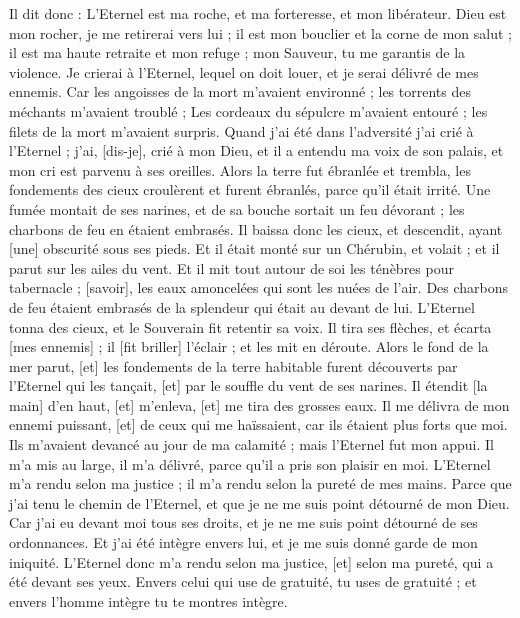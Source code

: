 \begin{multicols}{2}
Il dit donc : L'Eternel est ma roche, et ma forteresse, et mon libérateur.
Dieu est mon rocher, je me retirerai vers lui ; il est mon bouclier et la corne de mon salut ; il est ma haute retraite et mon refuge ; mon Sauveur, tu me garantis de la violence.
Je crierai à l'Eternel, lequel on doit louer, et je serai délivré de mes ennemis.
Car les angoisses de la mort m'avaient environné ; les torrents des méchants m'avaient troublé ;
Les cordeaux du sépulcre m'avaient entouré ; les filets de la mort m'avaient surpris.
Quand j'ai été dans l'adversité j'ai crié à l'Eternel ; j'ai, [dis-je], crié à mon Dieu, et il a entendu ma voix de son palais, et mon cri est parvenu à ses oreilles.
Alors la terre fut ébranlée et trembla, les fondements des cieux croulèrent et furent ébranlés, parce qu'il était irrité.
Une fumée montait de ses narines, et de sa bouche sortait un feu dévorant ; les charbons de feu en étaient embrasés.
Il baissa donc les cieux, et descendit, ayant [une] obscurité sous ses pieds.
Et il était monté sur un Chérubin, et volait ; et il parut sur les ailes du vent.
Et il mit tout autour de soi les ténèbres pour tabernacle ; [savoir], les eaux amoncelées qui sont les nuées de l'air.
Des charbons de feu étaient embrasés de la splendeur qui était au devant de lui.
L'Eternel tonna des cieux, et le Souverain fit retentir sa voix.
Il tira ses flèches, et écarta [mes ennemis] ; il [fit briller] l'éclair ; et les mit en déroute.
Alors le fond de la mer parut, [et] les fondements de la terre habitable furent découverts par l'Eternel qui les tançait, [et] par le souffle du vent de ses narines.
Il étendit [la main] d'en haut, [et] m'enleva, [et] me tira des grosses eaux.
Il me délivra de mon ennemi puissant, [et] de ceux qui me haïssaient, car ils étaient plus forts que moi.
Ils m'avaient devancé au jour de ma calamité ; mais l'Eternel fut mon appui.
Il m'a mis au large, il m'a délivré, parce qu'il a pris son plaisir en moi.
L'Eternel m'a rendu selon ma justice ; il m'a rendu selon la pureté de mes mains.
Parce que j'ai tenu le chemin de l'Eternel, et que je ne me suis point détourné de mon Dieu.
Car j'ai eu devant moi tous ses droits, et je ne me suis point détourné de ses ordonnances.
Et j'ai été intègre envers lui, et je me suis donné garde de mon iniquité.
L'Eternel donc m'a rendu selon ma justice, [et] selon ma pureté, qui a été devant ses yeux.
Envers celui qui use de gratuité, tu uses de gratuité ; et envers l'homme intègre tu te montres intègre.

\end{multicols}
